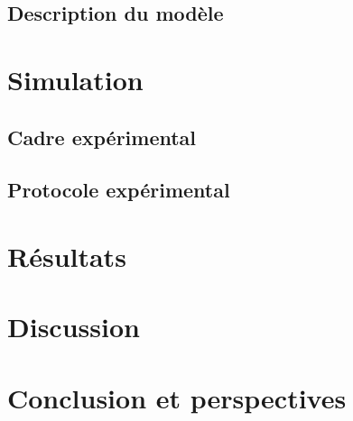 \documentclass{article}
\begin{document}
\subsection{Description du modèle}
\section{Simulation}
\subsection{Cadre expérimental}
\subsection{Protocole expérimental}
\section{Résultats}
\section{Discussion}
\section*{Conclusion et perspectives}
\end{document}
